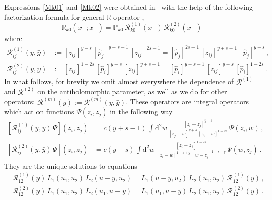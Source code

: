 \documentclass[a4paper,11pt]{article}
\numberwithin{equation}{section}
\begin{document}
Expressions \eqref{Mk01} and \eqref{Mk02} were obtained in~\cite[Section~3]{Derkachov:2005fg}
with the help of the following factorization formula for general $\mathbb{R}$-operator \cite[Section~2.3]{Derkachov:2005hw}, \cite[Section~3.3]{DM09}
\begin{equation}\label{Rfactor}
	\mathbb{R}_{k0}(x_+;x_-) = \mathbb{P}_{k0}\,\mathcal{R}^{(1)}_{k0}(x_-)\, \mathcal{R}^{(2)}_{k0}(x_+)
\end{equation}		
where
\begin{align}
	\nonumber
	\mathcal{R}^{(1)}_{ij}(y,\bar{y}) & :=
	[z_{ij}]^{y-s}\,[\hat{p}_j]^{y+s-1}\,[z_{ij}]^{2s-1} = 
	[\hat{p}_j]^{2s-1}\,[z_{ij}]^{y+s-1}
	\,[\hat{p}_j]^{y-s} \,, \\
	\label{R12def}
	\mathcal{R}^{(2)}_{ij}(y,\bar{y}) & := 
	[z_{ij}]^{1-2s}\,[\hat{p}_i]^{y-s}\,[z_{ij}]^{y+s-1} = 
	[\hat{p}_i]^{y+s-1}\,[z_{ij}]^{y-s}
	\,[\hat{p}_i]^{1-2s} \,.
\end{align}
In what follows, for brevity we omit almost everywhere the dependence of $\mathcal{R}^{(1)}$ and $\mathcal{R}^{(2)}$ on the antiholomorphic parameter, as well as we do for other operators: $\mathcal{R}^{(m)}(y) := \mathcal{R}^{(m)}(y,\bar{y})$.
These operators are integral operators which act on functions $\Psi(z_i,z_j)$ in the following way
\begin{align}
	\nonumber
	\left[\mathcal{R}^{(1)}_{ij}(y,\bar{y}) \, \Psi\right](z_i, z_j) & = 
	c(y+s-1)\,
	\int \mathrm{d}^2 w \,
	\frac{[z_i-z_j]^{y-s}}{[z_j-w]^{y+s} \, [z_i-w]^{1-2s}} \,
	\Psi(z_i, w) \,,\\
	\label{R_kernel}
	\left[\mathcal{R}^{(2)}_{ij}(y,\bar{y}) \, \Psi\right](z_i, z_j) & = 
	c(y-s)\,
	\int \mathrm{d}^2 w \,
	\frac{[z_i-z_j]^{1-2s}}{[z_i-w]^{1-s+y} \, [w-z_j]^{1-s-y}} \,
	\Psi(w, z_j) \,.
\end{align}
They are the unique solutions to equations
\begin{align}
	& \nonumber
	\mathcal{R}^{(1)}_{1 2}(y) \, L_1(u_1, u_2) \, L_2(u-y, u_2) = 
	L_1(u-y, u_2) \, L_2(u_1, u_2) \, \mathcal{R}^{(1)}_{1 2}(y) \,, \\
	& \label{defR}
	\mathcal{R}^{(2)}_{1 2}(y) \, L_1(u_1, u_2) \, L_2(u_1, u-y) = 
	L_1(u_1, u-y) \, L_2(u_1, u_2) \, \mathcal{R}^{(2)}_{1 2}(y) \,.
\end{align}
\end{document}

